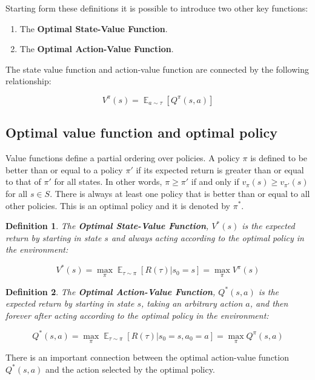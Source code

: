 \documentclass{article}
\newtheorem{definition}{Definition}
\DeclareMathOperator*{\E}{\mathbb{E}}
\begin{document}
Starting form these definitions it is possible to introduce two other key functions:

\begin{enumerate}
	\item The \textbf{Optimal State-Value Function}.
	\item The \textbf{Optimal Action-Value Function}.
\end{enumerate}

The state value function and action-value function are connected by the following relationship:

\begin{equation}
V^\pi(s) = \E_{a \sim \tau}[Q^\pi (s,a)]
\end{equation}

\subsection{Optimal value function and optimal policy }
Value functions define a partial ordering over policies. A policy $\pi$ is defined to be better than or equal to a policy $\pi'$ if its expected return is greater than or equal to that of $\pi'$ for all states. In other words, $\pi \geq \pi'$ if and only if $v_\pi(s) \geq v_{\pi'}(s)$ for all $s \in S$. There is always at least one policy that is better than or equal to all other policies. This is an optimal policy and it is denoted by $\pi^*$.

\begin{definition}
	The \textbf{Optimal State-Value Function}, $V^*(s)$ is the expected return by starting in state $s$ and always acting according to the \textit{optimal} policy in the environment:
	
	\begin{equation}
		V^{*}(s) = \max_\pi \E_{\tau \sim \pi} [R(\tau)| s_0 = s] = \max_\pi V^\pi(s)
	\end{equation}
\end{definition}

\begin{definition}
	The \textbf{Optimal Action-Value Function}, $Q^*(s,a)$ is the expected return by starting in state $s$, taking an arbitrary action $a$, and then forever after acting according to the \textit{optimal} policy in the environment:
	
	\begin{equation}
	Q^*(s,a) = \max_{\pi} \E_{\tau \sim \pi}{[R(\tau)| s_0 = s, a_0 = a]} = \max_\pi Q^\pi(s,a)
	\end{equation}
	
\end{definition}
There is an important connection between the optimal action-value function $Q^*(s,a)$ and the action selected by the optimal policy.
\end{document}
